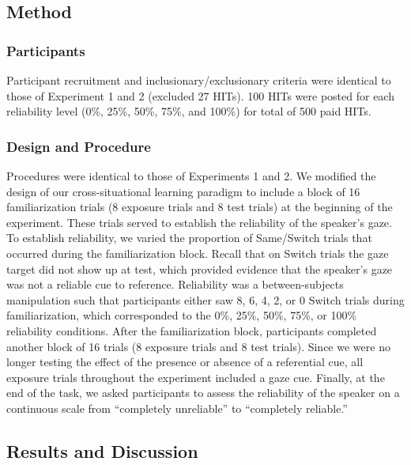 \documentclass[authoryear, review]{elsarticle}
\begin{document}
\subsection{Method}\label{method-2}

\subsubsection{Participants}\label{participants-2}

Participant recruitment and inclusionary/exclusionary criteria were
identical to those of Experiment 1 and 2 (excluded 27 HITs). 100 HITs
were posted for each reliability level (0\%, 25\%, 50\%, 75\%, and
100\%) for total of 500 paid HITs.

\subsubsection{Design and Procedure}\label{design-and-procedure-2}

Procedures were identical to those of Experiments 1 and 2. We modified
the design of our cross-situational learning paradigm to include a block
of 16 familiarization trials (8 exposure trials and 8 test trials) at
the beginning of the experiment. These trials served to establish the
reliability of the speaker's gaze. To establish reliability, we varied
the proportion of Same/Switch trials that occurred during the
familiarization block. Recall that on Switch trials the gaze target did
not show up at test, which provided evidence that the speaker's gaze was
not a reliable cue to reference. Reliability was a between-subjects
manipulation such that participants either saw 8, 6, 4, 2, or 0 Switch
trials during familiarization, which corresponded to the 0\%, 25\%,
50\%, 75\%, or 100\% reliability conditions. After the familiarization
block, participants completed another block of 16 trials (8 exposure
trials and 8 test trials). Since we were no longer testing the effect of
the presence or absence of a referential cue, all exposure trials
throughout the experiment included a gaze cue. Finally, at the end of
the task, we asked participants to assess the reliability of the speaker
on a continuous scale from ``completely unreliable'' to ``completely
reliable.''

\subsection{Results and Discussion}\label{results-and-discussion-2}
\end{document}
